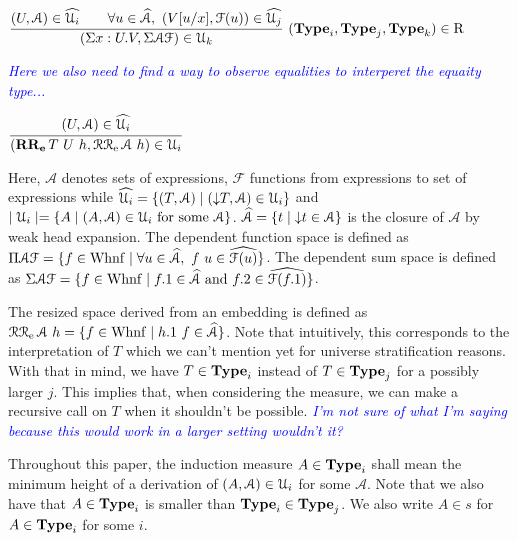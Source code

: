 \documentclass[a4paper,english]{lipics-utf8x}
\newcommand\meta[1]{\noindent\textcolor{blue}{\emph{#1}}}
\begin{document}
  \begin{center}
  \(
    \rux{(U, \mathcal{A}) \in \widehat{\U_i} \qquad
        \forall u \in \widehat{\mathcal{A}},\ (V[u/x], \mathcal{F}(u)) \in
        \widehat{\U_j}
       }{(\Sigma x:U.V, \Sigma \mathcal{A} \mathcal{F}) \in \U_k
       }{(\Type_i, \Type_j, \Type_k) \in \R}
  \)
  \end{center}

  \meta{Here we also need to find a way to observe equalities to interperet
  the equaity type...}

  \begin{center}
  \(
    \ru{(U, \mathcal{A}) \in \widehat{\U_i}
      }{(\RRe{T}{U}{h}, \RRcal{\mathcal{A}}{h}) \in \U_i}
  \)
  \end{center}

  \noindent %
  Here, $\mathcal{A}$ denotes sets of expressions, $\mathcal{F}$ functions from
  expressions to set of expressions while
  $\widehat{\mathcal{U}_i} = \{ (T,\mathcal{A}) \mid ({\downarrow} T, \mathcal{A}) \in \mathcal{U}_i \}$
  and $\mid \mathcal{U}_i \mid = \{ A \mid (A, \mathcal{A}) \in \mathcal{U}_i \text{ for some }
  \mathcal{A} \}$.
  $\widehat{\mathcal{A}} = \{ t \mid {\downarrow} t \in \mathcal{A} \}$ is the closure
  of $\mathcal{A}$ by weak head expansion.
  The dependent function space is defined as
  $\Pi \mathcal{A} \mathcal{F} = \{ f \in \operatorname{Whnf} \mid \forall u \in
  \widehat{\mathcal{A}},\ f~u \in \widehat{\mathcal{F}(u)} \}$.
  The dependent sum space is defined as
  $\Sigma \mathcal{A} \mathcal{F} = \{ f \in \operatorname{Whnf} \mid f.1 \in
  \widehat{\mathcal{A}} \text{ and } f.2 \in \widehat{\mathcal{F}(f.1)} \}$.

  The resized space derived from an embedding is defined as
  $\operatorname{\mathcal{R}\mathcal{R}_e} \mathcal{A}\ h = \{ f \in \operatorname{Whnf} \mid h.1~f \in \widehat{\mathcal{A}}
  \}$.
  Note that intuitively, this corresponds to the interpretation of $T$
  which we can't mention yet for universe stratification reasons.
  With that in mind, we have $T \in \operatorname{\mathbf{Type}}_i$ instead of $T \in \operatorname{\mathbf{Type}}_j$ for
  a possibly larger $j$. This implies that, when considering the measure,
  we can make a recursive call on $T$ when it shouldn't be possible.
  \meta{I'm not sure of what I'm saying because this would work in a larger
  setting wouldn't it?}

  Throughout this paper, the induction measure $A \in \operatorname{\mathbf{Type}}_i$ shall mean the
  minimum height of a derivation of $(A, \mathcal{A}) \in \mathcal{U}_i$ for some
  $\mathcal{A}$. Note that we also have that $A \in \operatorname{\mathbf{Type}}_i$ is smaller
  than $\operatorname{\mathbf{Type}}_i \in \operatorname{\mathbf{Type}}_j$.
  We also write $A \in s$ for $A \in \operatorname{\mathbf{Type}}_i$ for some $i$.
\end{document}
